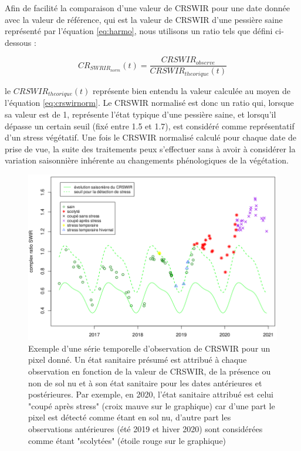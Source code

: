 \documentclass[a4paper, 12pt]{article} %
\begin{document}
Afin de facilité la comparaison d'une valeur de CRSWIR pour une date donnée avec la valeur de référence, qui est la valeur de CRSWIR d'une pessière saine représenté par l'équation \ref{eq:harmo}, nous utilisons un ratio tels que défini ci-dessous :

\begin{equation}\label{eq:crswirnorm}
CR_{SWRIR_{norm}}(t)=\dfrac{CRSWIR_{observe}}{CRSWIR_{theorique}(t)}
\end{equation} 

le $CRSWIR_{theorique}(t)$ représente bien entendu la valeur calculée au moyen de l'équation \ref{eq:crswirnorm}. Le CRSWIR normalisé est donc un ratio qui, lorsque sa valeur est de 1, représente l'état typique d'une pessière saine, et lorsqu'il dépasse un certain seuil (fixé entre 1.5 et 1.7), est considéré comme représentatif d'un stress végétatif. Une fois le CRSWIR normalisé calculé pour chaque date de prise de vue, la suite des traitements peux s'effectuer sans à avoir à considérer la variation saisonnière inhérente au changements phénologiques de la végétation.

\begin{figure}[H]
	\centering
	\includegraphics[width=0.9\linewidth]{illuArbreCoupe.png}
	\caption{Exemple d'une série temporelle d'observation de CRSWIR pour un pixel donné. Un état sanitaire présumé est attribué à chaque observation en fonction de la valeur de CRSWIR, de la présence ou non de sol nu et à son état sanitaire pour les dates antérieures et postérieures. Par exemple, en 2020, l'état sanitaire attribué est celui "coupé après stress" (croix mauve sur le graphique) car d'une part le pixel est détecté comme étant en sol nu, d'autre part les observations antérieures (été 2019 et hiver 2020) sont considérées comme étant "scolytées" (étoile rouge sur le graphique) }
	\label{fig:ex}
\end{figure}
\end{document}

